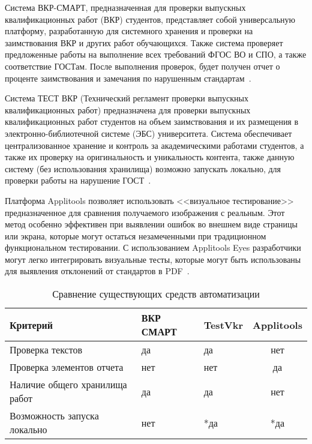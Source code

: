Система ВКР-СМАРТ, предназначенная для проверки выпускных квалификационных работ (ВКР) студентов, представляет собой универсальную платформу, разработанную для системного хранения и проверки на заимствования ВКР и других работ обучающихся. Также система проверяет предложенные работы на выполнение всех требований ФГОС ВО и СПО, а также соответствие ГОСТам. После выполнения проверок, будет получен отчет о проценте заимствования и замечания по нарушенным стандартам~\cite{VKR_VYZ}.

Система ТЕСТ ВКР (Технический регламент проверки выпускных квалификационных работ) предназначена для проверки выпускных квалификационных работ студентов на объем заимствования и их размещения в электронно-библиотечной системе (ЭБС) университета. Система обеспечивает централизованное хранение и контроль за академическими работами студентов, а также их проверку на оригинальность и уникальность контента, также данную систему (без использования хранилища) возможно запускать локально, для проверки работы на нарушение ГОСТ~\cite{TestVkr}.

Платформа Applitools позволяет использовать <<визуальное тестирование>> предназначенное для сравнения получаемого изображения с реальным. Этот метод особенно эффективен при выявлении ошибок во внешнем виде страницы или экрана, которые могут остаться незамеченными при традиционном функциональном тестировании. С использованием Applitools Eyes разработчики могут легко интегрировать визуальные тесты, которые могут быть использованы для выявления отклонений от стандартов в PDF~\cite{PdfTest}.



\begin{table}[ht]
	\begin{center}
		\begin{threeparttable}
			\caption{\label{t:cmp} Сравнение существующих средств автоматизации}
			\begin{tabular}{|p{4cm}|p{4cm}|p{4cm}|c|}
				\hline
				\textbf{Критерий} & \textbf{ВКР СМАРТ} & \textbf{TestVkr} & \textbf{Applitools} \\ \hline
				Проверка текстов  & да & да & нет\\ \hline
				Проверка элементов отчета & нет & нет & да \\ \hline
				Наличие общего хранилища работ  & да & да & нет \\ \hline
				Возможность запуска локально & нет & *да & *да \\ \hline
			\end{tabular}
		\end{threeparttable}
	\end{center}
\end{table}


